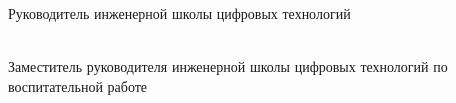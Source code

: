 \documentclass[a4paper,12pt]{article}
\begin{document}
Руководитель инженерной школы цифровых технологий \\
{} \hspace{2cm} \underline{\hspace{4cm}} \hspace{0.5cm} {} \\
\vspace{1.5em}

Заместитель руководителя инженерной школы цифровых технологий по воспитательной работе \\
{} \hspace{2cm} \underline{\hspace{4cm}} \hspace{0.5cm} {}
\end{document}
